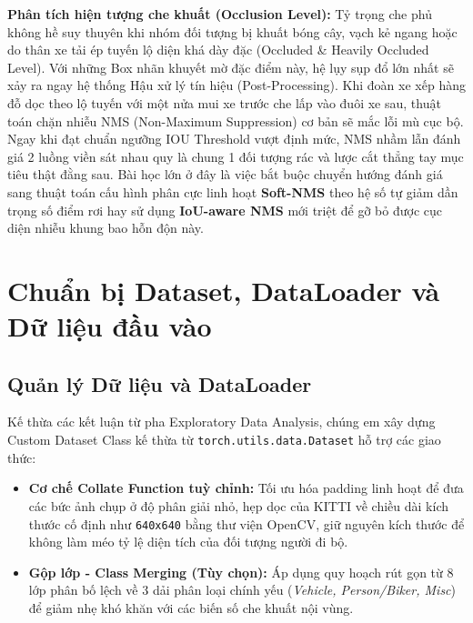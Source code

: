 \documentclass[a4paper]{article}
\theoremstyle{definition}
\begin{document}
\textbf{Phân tích hiện tượng che khuất (Occlusion Level):} Tỷ trọng che phủ không hề suy thuyên khi nhóm đối tượng bị khuất bóng cây, vạch kẻ ngang hoặc do thân xe tải ép tuyến lộ diện khá dày đặc (Occluded \& Heavily Occluded Level). Với những Box nhãn khuyết mờ đặc điểm này, hệ lụy sụp đổ lớn nhất sẽ xảy ra ngay hệ thống Hậu xử lý tín hiệu (Post-Processing). Khi đoàn xe xếp hàng đỗ dọc theo lộ tuyến với một nửa mui xe trước che lấp vào đuôi xe sau, thuật toán chặn nhiễu NMS (Non-Maximum Suppression) cơ bản sẽ mắc lỗi mù cục bộ. Ngay khi đạt chuẩn ngưỡng IOU Threshold vượt định mức, NMS nhầm lẫn đánh giá 2 luồng viền sát nhau quy là chung 1 đối tượng rác và lược cắt thẳng tay mục tiêu thật đằng sau. Bài học lớn ở đây là việc bắt buộc chuyển hướng đánh giá sang thuật toán cấu hình phân cực linh hoạt \textbf{Soft-NMS} theo hệ số tự giảm dần trọng số điểm rơi hay sử dụng \textbf{IoU-aware NMS} mới triệt để gỡ bỏ được cục diện nhiễu khung bao hỗn độn này.

\section{Chuẩn bị Dataset, DataLoader và Dữ liệu đầu vào}
\subsection{Quản lý Dữ liệu và DataLoader}
Kế thừa các kết luận từ pha Exploratory Data Analysis, chúng em xây dựng Custom Dataset Class kế thừa từ \texttt{torch.utils.data.Dataset} hỗ trợ các giao thức:
\begin{itemize}
	\item \textbf{Cơ chế Collate Function tuỳ chỉnh:} Tối ưu hóa padding linh hoạt để đưa các bức ảnh chụp ở độ phân giải nhỏ, hẹp dọc của KITTI về chiều dài kích thước cố định như \texttt{640x640} bằng thư viện OpenCV, giữ nguyên kích thước để không làm méo tỷ lệ diện tích của đối tượng người đi bộ.
	\item \textbf{Gộp lớp - Class Merging (Tùy chọn):} Áp dụng quy hoạch rút gọn từ 8 lớp phân bố lệch về 3 dải phân loại chính yếu (\textit{Vehicle, Person/Biker, Misc}) để giảm nhẹ khó khăn với các biến số che khuất nội vùng.
\end{itemize}
\end{document}
